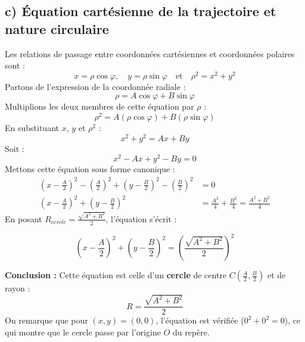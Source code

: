 \documentclass[11pt,a4paper]{article}
\begin{document}
\subsection*{c) Équation cartésienne de la trajectoire et nature circulaire}
Les relations de passage entre coordonnées cartésiennes et coordonnées polaires sont :
$$ x = \rho \cos\varphi, \quad y = \rho \sin\varphi \quad \text{et} \quad \rho^2 = x^2 + y^2 $$
Partons de l'expression de la coordonnée radiale :
$$ \rho = A \cos\varphi + B \sin\varphi $$
Multiplions les deux membres de cette équation par $\rho$ :
$$ \rho^2 = A (\rho \cos\varphi) + B (\rho \sin\varphi) $$
En substituant $x$, $y$ et $\rho^2$ :
$$ x^2 + y^2 = Ax + By $$
Soit :
$$ x^2 - Ax + y^2 - By = 0 $$
Mettons cette équation sous forme canonique :
\begin{align*}
\left(x - \frac{A}{2}\right)^2 - \left(\frac{A}{2}\right)^2 + \left(y - \frac{B}{2}\right)^2 - \left(\frac{B}{2}\right)^2 &= 0 \\
\left(x - \frac{A}{2}\right)^2 + \left(y - \frac{B}{2}\right)^2 &= \frac{A^2}{4} + \frac{B^2}{4} = \frac{A^2 + B^2}{4}
\end{align*}
En posant $R_{cercle} = \frac{\sqrt{A^2 + B^2}}{2}$, l'équation s'écrit :
\begin{sonucbox}
$$ \left(x - \frac{A}{2}\right)^2 + \left(y - \frac{B}{2}\right)^2 = \left(\frac{\sqrt{A^2 + B^2}}{2}\right)^2 $$
\end{sonucbox}
\textbf{Conclusion :} Cette équation est celle d'un \textbf{cercle} de centre $C\left(\frac{A}{2}, \frac{B}{2}\right)$ et de rayon :
$$ R = \frac{\sqrt{A^2 + B^2}}{2} $$
On remarque que pour $(x, y) = (0, 0)$, l'équation est vérifiée ($0^2 + 0^2 = 0$), ce qui montre que le cercle passe par l'origine $O$ du repère.
\end{document}
